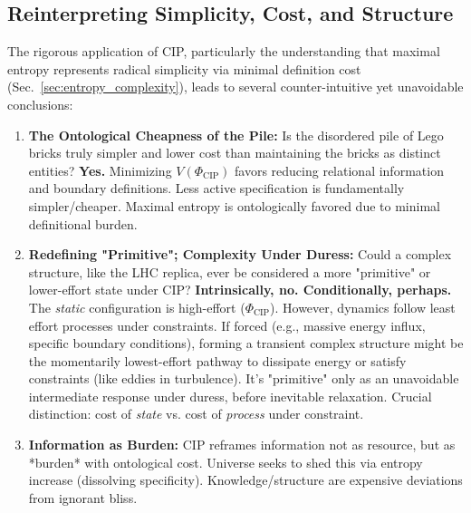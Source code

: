 \documentclass[11pt, a4paper]{article}
\newcommand{\subt}[1]{\mathrm{#1}}
\begin{document}
\subsection{Reinterpreting Simplicity, Cost, and Structure} \label{sec:reinterpreting}

The rigorous application of CIP, particularly the understanding that maximal entropy represents radical simplicity via minimal definition cost (Sec.~\ref{sec:entropy_complexity}), leads to several counter-intuitive yet unavoidable conclusions:

\begin{enumerate}
    \item \textbf{The Ontological Cheapness of the Pile:} Is the disordered pile of Lego bricks truly simpler and lower cost than maintaining the bricks as distinct entities? \textbf{Yes.} Minimizing $V(\Phi_{\subt{CIP}})$ favors reducing relational information and boundary definitions. Less active specification is fundamentally simpler/cheaper. Maximal entropy is ontologically favored due to minimal definitional burden.

    \item \textbf{Redefining "Primitive"; Complexity Under Duress:} Could a complex structure, like the LHC replica, ever be considered a more "primitive" or lower-effort state under CIP? \textbf{Intrinsically, no. Conditionally, perhaps.} The \textit{static} configuration is high-effort ($\Phi_{\subt{CIP}}$). However, dynamics follow least effort processes under constraints. If forced (e.g., massive energy influx, specific boundary conditions), forming a transient complex structure might be the momentarily lowest-effort pathway to dissipate energy or satisfy constraints (like eddies in turbulence). It's "primitive" only as an unavoidable intermediate response under duress, before inevitable relaxation. Crucial distinction: cost of \textit{state} vs. cost of \textit{process} under constraint.

    \item \textbf{Information as Burden:} CIP reframes information not as resource, but as *burden* with ontological cost. Universe seeks to shed this via entropy increase (dissolving specificity). Knowledge/structure are expensive \cite{Everett1957} deviations from ignorant bliss.


\end{enumerate}
\end{document}
